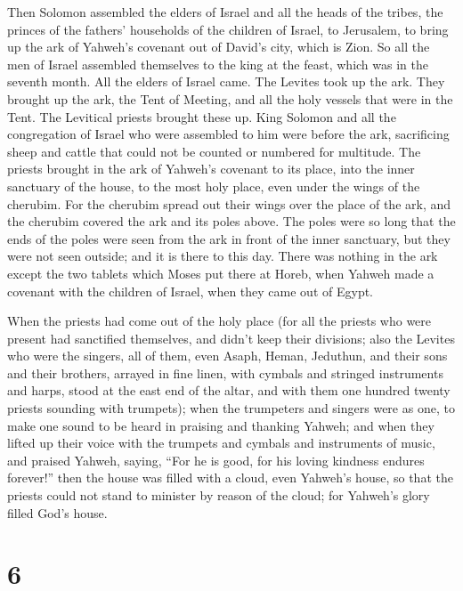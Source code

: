  Then Solomon assembled the elders of Israel and all the
heads of the tribes, the princes of the fathers' households of the
children of Israel, to Jerusalem, to bring up the ark of Yahweh's
covenant out of David's city, which is Zion.  So all the men
of Israel assembled themselves to the king at the feast, which was in
the seventh month.  All the elders of Israel came. The
Levites took up the ark.  They brought up the ark, the Tent
of Meeting, and all the holy vessels that were in the Tent. The
Levitical priests brought these up.  King Solomon and all
the congregation of Israel who were assembled to him were before the
ark, sacrificing sheep and cattle that could not be counted or numbered
for multitude.  The priests brought in the ark of Yahweh's
covenant to its place, into the inner sanctuary of the house, to the
most holy place, even under the wings of the cherubim.  For
the cherubim spread out their wings over the place of the ark, and the
cherubim covered the ark and its poles above.  The poles
were so long that the ends of the poles were seen from the ark in front
of the inner sanctuary, but they were not seen outside; and it is there
to this day.  There was nothing in the ark except the two
tablets which Moses put there at Horeb, when Yahweh made a covenant with
the children of Israel, when they came out of Egypt.

 When the priests had come out of the holy place (for all
the priests who were present had sanctified themselves, and didn't keep
their divisions;  also the Levites who were the singers,
all of them, even Asaph, Heman, Jeduthun, and their sons and their
brothers, arrayed in fine linen, with cymbals and stringed instruments
and harps, stood at the east end of the altar, and with them one hundred
twenty priests sounding with trumpets);  when the
trumpeters and singers were as one, to make one sound to be heard in
praising and thanking Yahweh; and when they lifted up their voice with
the trumpets and cymbals and instruments of music, and praised Yahweh,
saying, ``For he is good, for his loving kindness endures forever!''
then the house was filled with a cloud, even Yahweh's house,
 so that the priests could not stand to minister by reason
of the cloud; for Yahweh's glory filled God's house.

\hypertarget{section-5}{%
\section{6}\label{section-5}}

